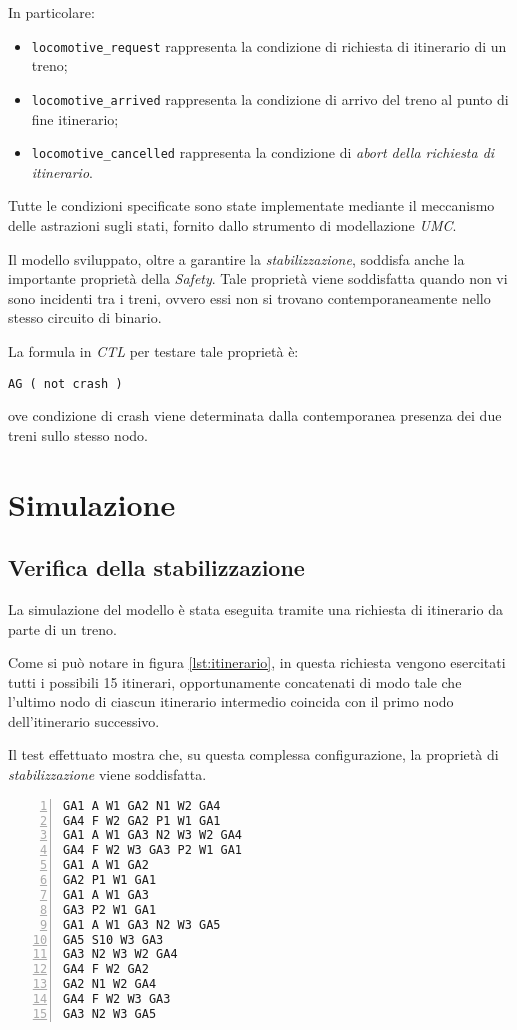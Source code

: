 \documentclass[10pt,a4paper,oneside]{report}
\begin{document}
In particolare:
\begin{itemize}
\item \verb!locomotive_request! rappresenta la condizione di richiesta di itinerario di un treno;
\item \verb!locomotive_arrived! rappresenta la condizione di arrivo del treno al punto di fine itinerario;
\item \verb!locomotive_cancelled! rappresenta la condizione di \emph{abort della richiesta di itinerario}.
\end{itemize}

Tutte le condizioni specificate sono state implementate mediante il meccanismo delle astrazioni sugli stati, fornito dallo strumento di modellazione \emph{UMC}.

Il modello sviluppato, oltre a garantire la \emph{stabilizzazione}, soddisfa anche la importante proprietà della \emph{Safety}. Tale proprietà viene soddisfatta quando non vi sono incidenti tra i treni, ovvero essi non si trovano contemporaneamente nello stesso circuito di binario.

La formula in \emph{CTL} per testare tale proprietà è:
\begin{lstlisting}
AG ( not crash )
\end{lstlisting}
ove condizione di crash viene determinata dalla contemporanea presenza dei due treni sullo stesso nodo.
 
\chapter{Simulazione}
\label{cap:simulation}
\section{Verifica della stabilizzazione}
La simulazione del modello è stata eseguita tramite una richiesta di itinerario da parte di un treno. 

Come si può notare in figura \ref{lst:itinerario}, in questa richiesta vengono esercitati tutti i possibili 15 itinerari, opportunamente concatenati di modo tale che l'ultimo nodo di ciascun itinerario intermedio coincida con il primo nodo dell'itinerario successivo.

Il test effettuato mostra che, su questa complessa configurazione, la proprietà di \emph{stabilizzazione} viene soddisfatta.

\begin{lstlisting}[numbers=left,
numberstyle=\tiny,caption={Simulazione di itinerario effettuata},
label=lst:itinerario]
GA1 A W1 GA2 N1 W2 GA4
GA4 F W2 GA2 P1 W1 GA1
GA1 A W1 GA3 N2 W3 W2 GA4
GA4 F W2 W3 GA3 P2 W1 GA1
GA1 A W1 GA2
GA2 P1 W1 GA1
GA1 A W1 GA3
GA3 P2 W1 GA1
GA1 A W1 GA3 N2 W3 GA5
GA5 S10 W3 GA3
GA3 N2 W3 W2 GA4
GA4 F W2 GA2
GA2 N1 W2 GA4
GA4 F W2 W3 GA3
GA3 N2 W3 GA5
\end{lstlisting}
\end{document}
